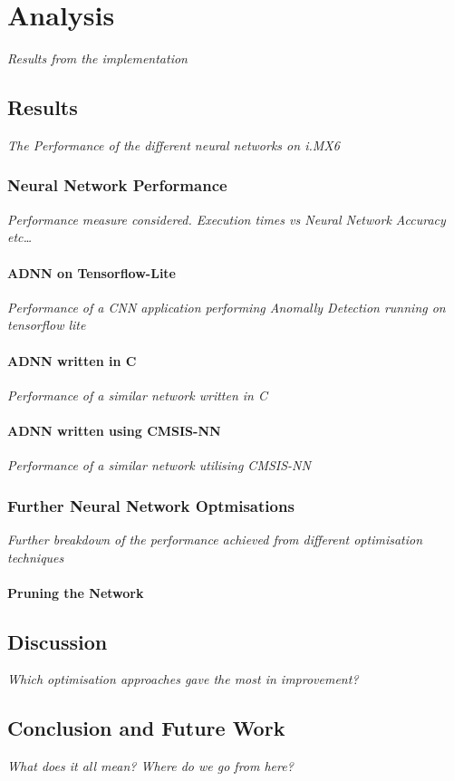 \part{Analysis}
\textit{Results from the implementation}

\chapter{Results}
\textit{The Performance of the different neural networks on i.MX6}

\section{Neural Network Performance}
\textit{Performance measure considered. Execution times vs Neural Network Accuracy etc\dots}

\subsection{ADNN on Tensorflow-Lite}
\textit{Performance of a CNN application performing Anomally Detection running on tensorflow lite}

\subsection{ADNN written in C}
\textit{Performance of a similar network written in C}

\subsection{ADNN written using CMSIS-NN}
\textit{Performance of a similar network utilising CMSIS-NN}

\section{Further Neural Network Optmisations}
\textit{Further breakdown of the performance achieved from different optimisation techniques}

\subsection{Pruning the Network}

\chapter{Discussion}
\textit{Which optimisation approaches gave the most in improvement?}

\chapter{Conclusion and Future Work}
\textit{What does it all mean? Where do we go from here?}
